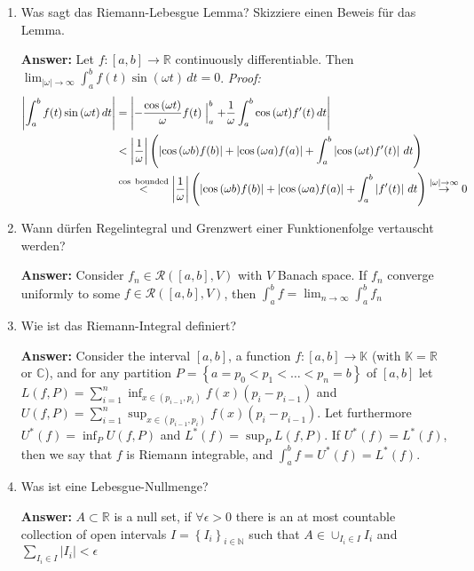 \documentclass[11pt]{article}
\newcommand{\abs}[1]{\left|#1\right|}
\newcommand{\RR}[0]{\mathbb{R}}
\newcommand{\CC}[0]{\mathbb{C}}
\newcommand{\NN}[0]{\mathbb{N}}
\newcommand{\KK}[0]{\mathbb{K}}
\begin{document}
\begin{enumerate}
    \item Was sagt das Riemann-Lebesgue Lemma? Skizziere einen Beweis für das Lemma.

    \textbf{Answer:} Let $f\colon [a, b] \to \RR$ continuously differentiable. Then $\lim_{\abs{\omega}\to\infty} \int_a^b f(t) \sin(\omega t) \,dt = 0$.
    \textit{Proof:} $$\begin{aligned}
        \abs{\int_a^b f(t) \sin{(\omega t)}\,dt} &= \abs{-\frac{\cos{(\omega t)}}{\omega}f(t)\Bigm|_a^b + \frac{1}{\omega} \int_a^b \cos{(\omega t)} f^\prime(t)\,dt} \\
        &< \abs{\frac{1}{\omega}} \left(\abs{\cos{(\omega b)} f(b)} + \abs{\cos{(\omega a)} f(a)} + \int_a^b \abs{\cos{(\omega t)} f^\prime(t)}\,dt \right)\\
        &\stackrel{\cos\text{ bounded}}{<} \abs{\frac{1}{\omega}} \left(\abs{\cos{(\omega b)} f(b)} + \abs{\cos{(\omega a)} f(a)} + \int_a^b \abs{f^\prime(t)}\,dt \right) \stackrel{\abs{\omega} \to \infty}{\to} 0
    \end{aligned}$$
    \item Wann dürfen Regelintegral und Grenzwert einer Funktionenfolge vertauscht werden?

    \textbf{Answer:} Consider $f_n \in \mathcal{R}([a, b], V)$ with $V$ Banach space. If $f_n$ converge uniformly to some $f\in \mathcal{R}([a, b], V)$, then $\int_a^b f = \lim_{n \to \infty} \int_a^b f_n$

    \item Wie ist das Riemann-Integral definiert?

    \textbf{Answer:} Consider the interval $[a, b]$, a function $f\colon [a, b] \to \KK$ (with $\KK = \RR$ or $\CC$), and for any partition $P = \left\{a = p_0 < p_1 < \dots < p_n = b\right\}$ of $[a, b]$ let $L(f, P) = \sum_{i = 1}^n \inf_{x \in (p_{i-1}, p_i)}f(x) (p_i - p_{i-1})$ and $U(f, P) = \sum_{i = 1}^n \sup_{x \in (p_{i-1}, p_i)}f(x) (p_i - p_{i-1})$. Let furthermore $U^*(f) = \inf_{P} U(f, P)$ and $L^*(f) = \sup_{P} L(f, P)$. If $U^*(f) = L^*(f)$, then we say that $f$ is Riemann integrable, and $\int_a^b f = U^*(f) = L^*(f)$.

    \item Was ist eine Lebesgue-Nullmenge?

    \textbf{Answer:} $A \subset \RR$ is a null set, if $\forall \epsilon > 0$ there is an at most countable collection of open intervals $I = \left\{I_i\right\}_{i \in \NN}$ such that $A \in \cup_{I_i \in I} I_i$ and $\sum_{I_i \in I} \abs{I_i} < \epsilon$


\end{enumerate}
\end{document}
